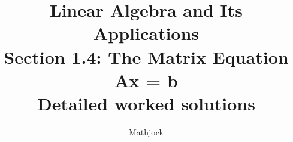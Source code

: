 
\title{\textbf{Linear Algebra and Its Applications}\\[0.3em]Section 1.4: The Matrix Equation Ax = b\\[0.3em]\large Detailed worked solutions}
\author{Mathjock}
\date{}

\maketitle
\bookinfo
\tableofcontents
\clearpage
\renewcommand{\thesection}{1.\arabic{section}}
\renewcommand{\theHsection}{1.\arabic{section}}
\setcounter{section}{3}


